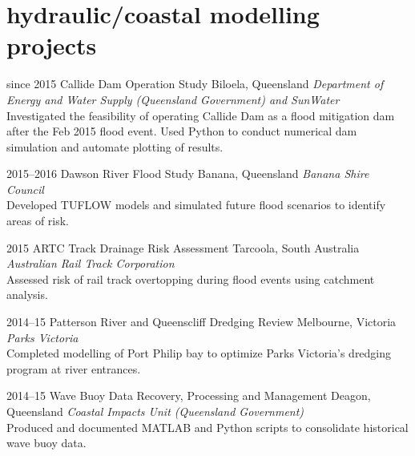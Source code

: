 

\section{hydraulic/coastal modelling projects}

\begin{entrylist}
\entry%
{since 2015}
{Callide Dam Operation Study}
{Biloela, Queensland}
{\emph{Department of Energy and Water Supply (Queensland Government) and SunWater} \\
Investigated the feasibility of operating Callide Dam as a flood mitigation dam after the Feb 2015 flood event. Used Python to conduct numerical dam simulation and automate plotting of results. }
\end{entrylist}

\begin{entrylist}
\entry%
{2015--2016}
{Dawson River Flood Study}
{Banana, Queensland}
{\emph{Banana Shire Council} \\
Developed TUFLOW models and simulated future flood scenarios to identify areas of risk. }
\end{entrylist}

\begin{entrylist}
\entry%
{2015}
{ARTC Track Drainage Risk Assessment}
{Tarcoola, South Australia}
{\emph{Australian Rail Track Corporation} \\
Assessed risk of rail track overtopping during flood events using catchment analysis.}
\end{entrylist}

\begin{entrylist}
\entry%
{2014--15}
{Patterson River and Queenscliff Dredging Review}
{Melbourne, Victoria}
{\emph{Parks Victoria} \\
Completed modelling of Port Philip bay to optimize Parks Victoria's dredging program at river entrances.}
\end{entrylist}

\begin{entrylist}
\entry%
{2014--15}
{Wave Buoy Data Recovery, Processing and Management}
{Deagon, Queensland}
{\emph{Coastal Impacts Unit (Queensland Government)} \\
Produced and documented MATLAB and Python scripts to consolidate historical wave buoy data.}
\end{entrylist}



